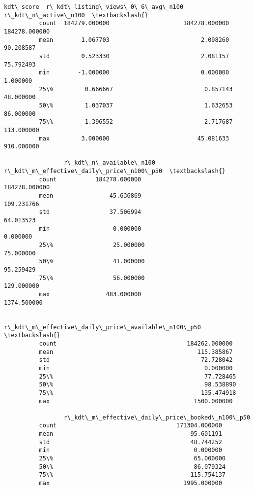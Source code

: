 \documentclass[11pt]{article}
\begin{document}
\begin{Verbatim}[commandchars=\\\{\}]
                     kdt\_score  r\_kdt\_listing\_views\_0\_6\_avg\_n100  r\_kdt\_n\_active\_n100  \textbackslash{}
          count  184279.000000                     184278.000000        184278.000000   
          mean        1.067703                          2.098260            90.208587   
          std         0.523330                          2.081157            75.792493   
          min        -1.000000                          0.000000             1.000000   
          25\%         0.666667                          0.857143            48.000000   
          50\%         1.037037                          1.632653            86.000000   
          75\%         1.396552                          2.717687           113.000000   
          max         3.000000                         45.081633           910.000000   
          
                 r\_kdt\_n\_available\_n100  r\_kdt\_m\_effective\_daily\_price\_n100\_p50  \textbackslash{}
          count           184278.000000                           184278.000000   
          mean                45.636869                              109.231766   
          std                 37.506994                               64.013523   
          min                  0.000000                                0.000000   
          25\%                 25.000000                               75.000000   
          50\%                 41.000000                               95.259429   
          75\%                 56.000000                              129.000000   
          max                483.000000                             1374.500000   
          
                 r\_kdt\_m\_effective\_daily\_price\_available\_n100\_p50  \textbackslash{}
          count                                     184262.000000   
          mean                                         115.385867   
          std                                           72.728042   
          min                                            0.000000   
          25\%                                           77.728465   
          50\%                                           98.538890   
          75\%                                          135.474918   
          max                                         1500.000000   
          
                 r\_kdt\_m\_effective\_daily\_price\_booked\_n100\_p50  
          count                                  171304.000000  
          mean                                       95.601191  
          std                                        48.744252  
          min                                         0.000000  
          25\%                                        65.000000  
          50\%                                        86.079324  
          75\%                                       115.754137  
          max                                      1995.000000  
\end{Verbatim}
            
\end{document}
